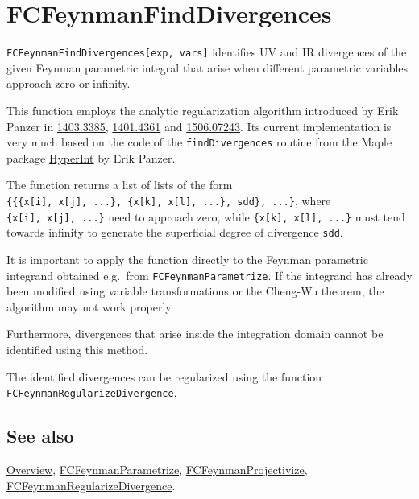 \documentclass[../FeynCalcManual.tex]{subfiles}
\begin{document}
\hypertarget{fcfeynmanfinddivergences}{
\section{FCFeynmanFindDivergences}\label{fcfeynmanfinddivergences}}

\texttt{FCFeynmanFindDivergences[\allowbreak{}exp,\ \allowbreak{}vars]}
identifies UV and IR divergences of the given Feynman parametric
integral that arise when different parametric variables approach zero or
infinity.

This function employs the analytic regularization algorithm introduced
by Erik Panzer in \href{https://arxiv.org/abs/1403.3385}{1403.3385},
\href{https://arxiv.org/abs/1401.4361}{1401.4361} and
\href{https://arxiv.org/abs/1506.07243}{1506.07243}. Its current
implementation is very much based on the code of the
\texttt{findDivergences} routine from the Maple package
\href{https://bitbucket.org/PanzerErik/hyperint/}{HyperInt} by Erik
Panzer.

The function returns a list of lists of the form
\texttt{\{\allowbreak{}\{\allowbreak{}\{\allowbreak{}x[\allowbreak{}i],\ \allowbreak{}x[\allowbreak{}j],\ \allowbreak{}...\},\ \allowbreak{}\{\allowbreak{}x[\allowbreak{}k],\ \allowbreak{}x[\allowbreak{}l],\ \allowbreak{}...\},\ \allowbreak{}sdd\},\ \allowbreak{}...\}},
where
\texttt{\{\allowbreak{}x[\allowbreak{}i],\ \allowbreak{}x[\allowbreak{}j],\ \allowbreak{}...\}}
need to approach zero, while
\texttt{\{\allowbreak{}x[\allowbreak{}k],\ \allowbreak{}x[\allowbreak{}l],\ \allowbreak{}...\}}
must tend towards infinity to generate the superficial degree of
divergence \texttt{sdd}.

It is important to apply the function directly to the Feynman parametric
integrand obtained e.g.~from \texttt{FCFeynmanParametrize}. If the
integrand has already been modified using variable transformations or
the Cheng-Wu theorem, the algorithm may not work properly.

Furthermore, divergences that arise inside the integration domain cannot
be identified using this method.

The identified divergences can be regularized using the function
\texttt{FCFeynmanRegularizeDivergence}.

\subsection{See also}

\hyperlink{toc}{Overview},
\hyperlink{fcfeynmanparametrize}{FCFeynmanParametrize},
\hyperlink{fcfeynmanprojectivize}{FCFeynmanProjectivize},
\hyperlink{fcfeynmanregularizedivergence}{FCFeynmanRegularizeDivergence}.
\end{document}
